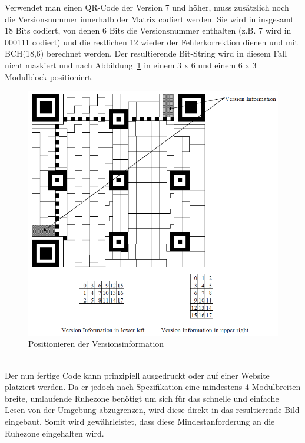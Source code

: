 Verwendet man einen QR-Code der Version 7 und höher, muss zusätzlich noch die Versionsnummer innerhalb der Matrix codiert werden. Sie wird in insgesamt 18 Bits codiert, von denen 6 Bits die Versionsnummer enthalten (z.B. 7 wird in 000111 codiert) und die restlichen 12 wieder der Fehlerkorrektion dienen und mit BCH(18,6) berechnet werden. Der resultierende Bit-String wird in diesem Fall nicht maskiert und nach Abbildung~\ref{fig:versioninformationpositioning} in einem 3 x 6 und einem 6 x 3 Modulblock positioniert.\\
\begin{figure}[htbp]
	\centering
	\includegraphics[width=15cm]{Bilder/QR_Version_Information.png}
	\caption[Positionieren der Versionsinformation]{Positionieren der Versionsinformation\footnotemark}
	\label{fig:versioninformationpositioning}
	\hfill
\end{figure}
~\\

Der nun fertige Code kann prinzipiell ausgedruckt oder auf einer Website platziert werden. Da er jedoch nach Spezifikation eine mindestens 4 Modulbreiten breite, umlaufende Ruhezone benötigt um sich für das schnelle und einfache Lesen von der Umgebung abzugrenzen, wird diese direkt in das resultierende Bild eingebaut. Somit wird gewährleistet, dass diese Mindestanforderung an die Ruhezone eingehalten wird.

